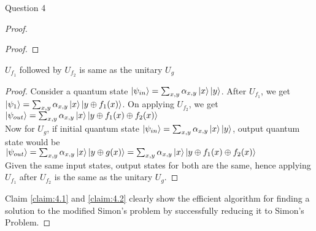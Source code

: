 \begin{solution}{Question 4}
\begin{proof}
\begin{proof}
    \end{proof}

    \begin{claim} \label{claim:4.2}
        $U_{f_1}$ followed by $U_{f_2}$ is same as the unitary $U_g$
    \end{claim}

    \begin{proof}
    Consider a quantum state $\ket{\psi_{in}} = \sum_{x,y} \alpha_{x,y}\ket{x}\ket{y}$. After $U_{f_1}$, we get $\ket{\psi_1} = \sum_{x,y} \alpha_{x,y}\ket{x}\ket{y \oplus f_1(x)}$. On applying $U_{f_2}$, we get $\ket{\psi_{out}} = \sum_{x,y} \alpha_{x,y}\ket{x}\ket{y \oplus f_1(x) \oplus f_2(x)}$\\

    Now for $U_g$, if initial quantum state $\ket{\psi_{in}} = \sum_{x,y} \alpha_{x,y}\ket{x}\ket{y}$, output quantum state would be $\ket{\psi_{out}} = \sum_{x,y} \alpha_{x,y}\ket{x}\ket{y \oplus g(x)} =  \sum_{x,y} \alpha_{x,y}\ket{x}\ket{y \oplus f_1(x) \oplus f_2(x)}$\\

    Given the same input states, output states for both are the same, hence applying $U_{f_1}$ after $U_{f_2}$ is the same as the unitary $U_g$.
    \end{proof}

    Claim \ref{claim:4.1} and \ref{claim:4.2} clearly show the efficient algorithm for finding a solution to the modified Simon's problem by successfully reducing it to Simon's Problem.
    
    \end{proof}
\end{solution}
